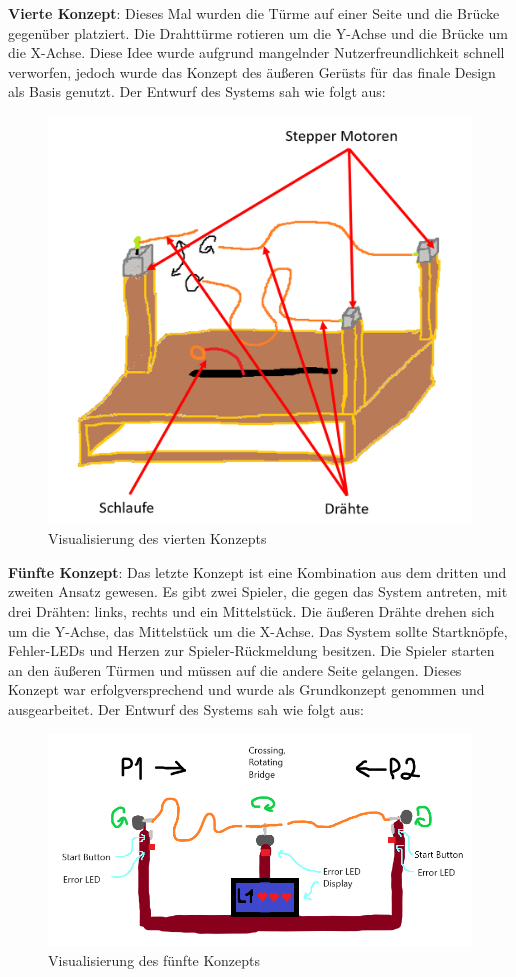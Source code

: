 \textbf{Vierte Konzept}: Dieses Mal wurden die Türme auf einer Seite und die Brücke gegenüber platziert. Die Drahttürme rotieren um die Y-Achse und die Brücke um die X-Achse. Diese Idee wurde aufgrund mangelnder Nutzerfreundlichkeit schnell verworfen, jedoch wurde das Konzept des äußeren Gerüsts für das finale Design als Basis genutzt. Der Entwurf des Systems sah wie folgt aus:

\begin{figure}[H]
 \centerline{\includegraphics[width=.6\textwidth,scale=1]{./images/Konzeptpapier_6.png}}
 \caption{Visualisierung des vierten Konzepts}\label{imageLabel}
\end{figure} 

\textbf{Fünfte Konzept}: Das letzte Konzept ist eine Kombination aus dem dritten und zweiten Ansatz gewesen. Es gibt zwei Spieler, die gegen das System antreten, mit drei Drähten: links, rechts und ein Mittelstück. Die äußeren Drähte drehen sich um die Y-Achse, das Mittelstück um die X-Achse. Das System sollte Startknöpfe, Fehler-LEDs und Herzen zur Spieler-Rückmeldung besitzen. Die Spieler starten an den äußeren Türmen und müssen auf die andere Seite gelangen. Dieses Konzept war erfolgversprechend und wurde als Grundkonzept genommen und ausgearbeitet. Der Entwurf des Systems sah wie folgt aus:

\begin{figure}[H]
 \centerline{\includegraphics[width=\textwidth,scale=1]{./images/Konzeptpapier_5.png}}
 \caption{Visualisierung des fünfte Konzepts}\label{imageLabel}
\end{figure} 

